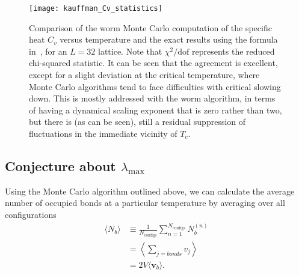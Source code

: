 \documentclass[../main.tex]{subfiles}
\begin{document}
\begin{figure}[htpb]
    \centering
    \texttt{[image: kauffman\_Cv\_statistics]}
    \caption{Comparison of the worm Monte Carlo computation of the specific
        heat $C_v$ versus temperature and the exact results using the formula
        in~\cite{bkaufman}, for an $L=32$ lattice. Note that $\chi^2 /
        \text{dof}$ represents the reduced chi-squared statistic. It can be
        seen that the agreement is excellent, except for a slight deviation at
        the critical temperature, where Monte Carlo algorithms tend to face
        difficulties with critical slowing down.  This is mostly addressed with
        the worm algorithm, in terms of having a dynamical scaling exponent
        that is zero rather than two, but there is (as can be seen), still a
        residual suppression of fluctuations in the immediate vicinity of
        $T_c$.
    \label{Kcompare}}
\end{figure}
\subsection{Conjecture about \texorpdfstring{$\lambda_{\max}$}{λmax}}%
\label{ssec:conjecture}
Using the Monte Carlo algorithm outlined above, we can calculate the average number of occupied bonds at a particular
temperature by averaging over all configurations
\begin{align}
    \langle N_b\rangle
        &\equiv \frac{1}{N_{\mathrm{configs}}}\sum_{n=1}^{N_{\mathrm{\mathrm{configs}}}} N_b^{(n)}\\
        &= \left\langle \sum_{j=bonds} v_j \right\rangle \\
        &= 2V\langle \mathbf{v}_b\rangle.
    \label{eq:link_avg}
\end{align}
\end{document}
